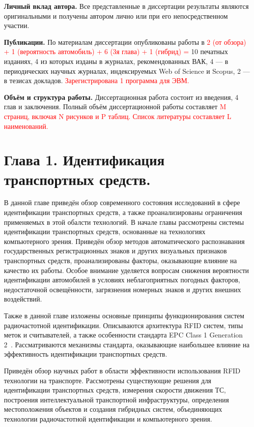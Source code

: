 \documentclass[12pt]{article}
\theoremstyle{definition}
\begin{document}
\textbf{Личный вклад автора.} Все представленные в диссертации результаты являются оригинальными и получены автором лично или при его непосредственном участии.

\textbf{Публикации.} По материалам диссертации опубликованы работы в \textcolor{red}{2 (от обзора) + 1 (вероятность автомобиль) + 6 (3я глава) + 1 (гибрид) =} 10 печатных изданиях, 4 из которых изданы в журналах, рекомендованных ВАК, 4 — в периодических научных журналах, индексируемых Web of Science и Scopus, 2 — в тезисах докладов. \textcolor{red}{Зарегистрирована 1 программа для ЭВМ.}

\textbf{Объём и структура работы.} Диссертационная работа состоит из введения, 4 глав и заключения. Полный объём диссертационной работы составляет \textcolor{red}{M страниц, включая N рисунков и P таблиц. Список литературы составляет L наименований.}


\pagebreak

\section{Глава 1. Идентификация транспортных средств.}
\label{sec:ch1}

В данной главе приведён обзор современного состояния исследований в сфере идентификации транспортных средств, а также проанализированы ограничения применяемых в этой обалсти технологий. В начале главы рассмотрены системы идентификации транспортных средств, основанные на технологиях компьютерного зрения. Приведён обзор методов автоматического распознавания государственных регистрационных знаков и других визуальных признаков транспортных средств, проанализированы факторы, оказывающие влияние на качество их работы. Особое внимание уделяется вопросам снижения вероятности идентификации автомобилей в условиях неблагоприятных погодных факторов, недостаточной освещённости, загрязнения номерных знаков и других внешних воздействий.

Также в данной главе изложены основные принципы функционирования систем радиочастотной идентификации. Описываются архитектура RFID систем, типы меток и считывателей, а также особенности стандарта EPC Class 1 Generation 2~\cite{StdGen2}. Рассматриваются механизмы стандарта, оказывающие наибольшее влияние на эффективность идентификации транспортных средств.

Приведён обзор научных работ в области эффективности использования RFID технологии на транспорте. Рассмотрены существующие решения для идентификации транспортных средств, измерения скорости движения ТС, построения интеллектуальной транспортной инфраструктуры, определения местоположения объектов и создания гибридных систем, объединяющих технологии радиочастотной идентификации и компьютерного зрения.
\end{document}
